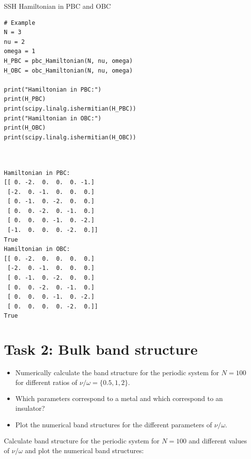 \documentclass{report}
\begin{document}
\begin{example}{SSH Hamiltonian in PBC and OBC}{}
    \begin{minipage}[t]{0.48\textwidth}
    \begin{lstlisting}[basicstyle=\ttfamily\scriptsize]
# Example
N = 3
nu = 2
omega = 1
H_PBC = pbc_Hamiltonian(N, nu, omega)
H_OBC = obc_Hamiltonian(N, nu, omega)

print("Hamiltonian in PBC:")
print(H_PBC)
print(scipy.linalg.ishermitian(H_PBC))
print("Hamiltonian in OBC:")
print(H_OBC)
print(scipy.linalg.ishermitian(H_OBC))



    \end{lstlisting}
    \end{minipage}
    \hfill
    \begin{minipage}[t]{0.48\textwidth}
    \begin{lstlisting}[basicstyle=\ttfamily\scriptsize]
Hamiltonian in PBC:
[[ 0. -2.  0.  0.  0. -1.]
 [-2.  0. -1.  0.  0.  0.]
 [ 0. -1.  0. -2.  0.  0.]
 [ 0.  0. -2.  0. -1.  0.]
 [ 0.  0.  0. -1.  0. -2.]
 [-1.  0.  0.  0. -2.  0.]]
True
Hamiltonian in OBC:
[[ 0. -2.  0.  0.  0.  0.]
 [-2.  0. -1.  0.  0.  0.]
 [ 0. -1.  0. -2.  0.  0.]
 [ 0.  0. -2.  0. -1.  0.]
 [ 0.  0.  0. -1.  0. -2.]
 [ 0.  0.  0.  0. -2.  0.]]
True
    \end{lstlisting}
    \end{minipage}
\end{example}

\section{Task 2:  Bulk band structure}
\setcounter{tcb@cnt@question}{0}

\begin{question}{}{}
    \begin{itemize}
        \item Numerically calculate the band structure for the periodic system for $N = 100$ for different ratios of $\nu/\omega = \{0.5,1,2\}$. 
        \item Which parameters correspond to a metal and which correspond to an insulator?
        \item Plot the numerical band structures for the different parameters of $\nu/\omega$.
    \end{itemize}
\end{question}

\sol Calculate band structure for the periodic system for $N = 100$ and different values of $\nu/\omega$ and plot the numerical band structures:
\end{document}
